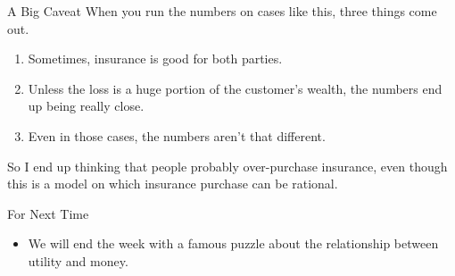 \documentclass[
  ignorenonframetext,
]{beamer}
\providecommand{\tightlist}{%
  \setlength{\itemsep}{0pt}\setlength{\parskip}{0pt}}
\renewcommand{\,}{\text{, }}
\begin{document}
\begin{frame}{A Big Caveat}
\protect\hypertarget{a-big-caveat}{}
When you run the numbers on cases like this, three things come out.

\begin{enumerate}
\tightlist
\item
  Sometimes, insurance is good for both parties. \pause
\item
  Unless the loss is a huge portion of the customer's wealth, the
  numbers end up being really close. \pause
\item
  Even in those cases, the numbers aren't that different.
\end{enumerate}

So I end up thinking that people probably over-purchase insurance, even
though this is a model on which insurance purchase can be rational.
\end{frame}

\begin{frame}{For Next Time}
\protect\hypertarget{for-next-time}{}
\begin{itemize}
\tightlist
\item
  We will end the week with a famous puzzle about the relationship
  between utility and money.
\end{itemize}
\end{frame}
\end{document}
